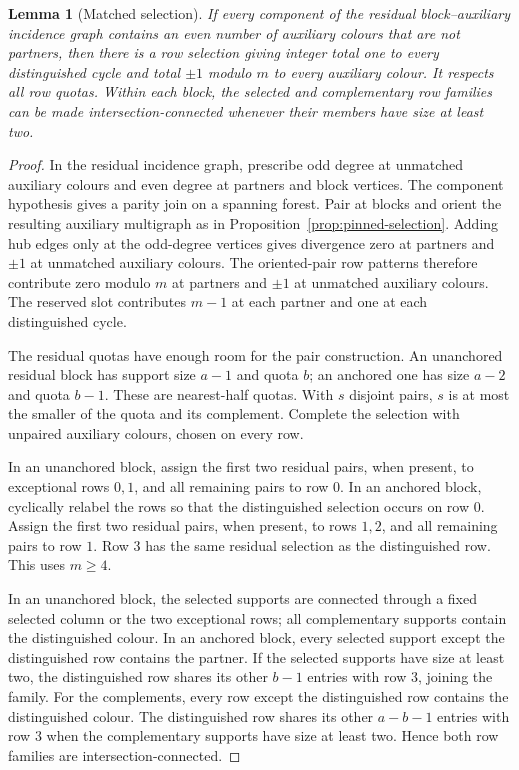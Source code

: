 \documentclass[11pt,reqno]{amsart}
\numberwithin{equation}{section}
\newtheorem{lemma}[theorem]{Lemma}
\theoremstyle{definition}
\theoremstyle{remark}
\begin{document}
\begin{lemma}[Matched selection]\label{lem:matched}
If every component of the residual block--auxiliary incidence graph contains an
even number of auxiliary colours that are not partners, then there is a row
selection giving integer total one to every distinguished cycle and total
$\pm1$ modulo $m$ to every auxiliary colour. It respects all row quotas.
Within each block, the selected and complementary row families can be made
intersection-connected whenever their members have size at least two.
\end{lemma}
\begin{proof}
In the residual incidence graph, prescribe odd degree at unmatched auxiliary colours and even
degree at partners and block vertices. The component hypothesis gives a parity join
on a spanning forest. Pair at blocks and orient the resulting auxiliary
multigraph as in Proposition~\ref{prop:pinned-selection}. Adding hub edges only at the
odd-degree vertices gives divergence zero at partners and $\pm1$ at unmatched auxiliary colours.
The oriented-pair row patterns therefore contribute zero modulo $m$ at partners and
$\pm1$ at unmatched auxiliary colours. The reserved slot contributes $m-1$ at each partner and one at
each distinguished cycle.

The residual quotas have enough room for the pair construction. An
unanchored residual block has support size $a-1$ and quota $b$; an anchored
one has size $a-2$ and quota $b-1$. These are nearest-half quotas. With $s$
disjoint pairs, $s$ is at most the smaller of the quota and its complement.
Complete the selection with unpaired auxiliary colours, chosen on every row.

In an unanchored block, assign the first two residual pairs, when present,
to exceptional rows $0,1$, and all remaining pairs to row $0$. In an anchored block,
cyclically relabel the rows so that the distinguished selection occurs on
row $0$. Assign the first two residual pairs, when present, to rows $1,2$,
and all remaining pairs to row $1$. Row $3$ has the same residual selection as the distinguished
row. This uses $m\ge4$.

In an unanchored block, the selected supports are connected through a fixed
selected column or the two exceptional rows; all complementary supports
contain the distinguished colour. In an anchored block, every selected
support except the distinguished row contains the partner. If the selected
supports have size at least two, the distinguished row shares its other
$b-1$ entries with row
$3$, joining the family. For the complements, every row except the
distinguished row contains the distinguished colour. The distinguished row
shares its other $a-b-1$ entries with row $3$ when the complementary supports
have size at least two. Hence both row families are intersection-connected.
\end{proof}
\end{document}

